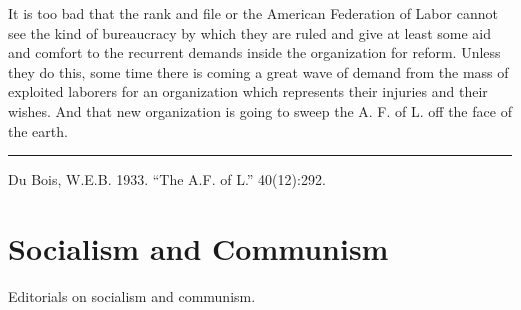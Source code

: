 \documentclass[letterpaper,10pt,english]{jupyterBook}
\begin{document}
\sphinxAtStartPar
It is too bad that the rank and file or the American Federation of Labor cannot see the kind of bureaucracy by which they are ruled and give at least some aid and comfort to the recurrent demands inside the organization for reform. Unless they do this, some time there is coming a great wave of demand from the mass of exploited laborers for an organization which represents their injuries and their wishes. And that new organization is going to sweep the A. F. of L. off the face of the earth.


\bigskip\hrule\bigskip


\sphinxAtStartPar
{} Du Bois, W.E.B. 1933. “The A.F. of L.”  40(12):292.


\section{Socialism and Communism}
\label{\detokenize{Sections/socialism:socialism-and-communism}}\label{\detokenize{Sections/socialism::doc}}
\sphinxAtStartPar
Editorials on socialism and communism.
\end{document}
